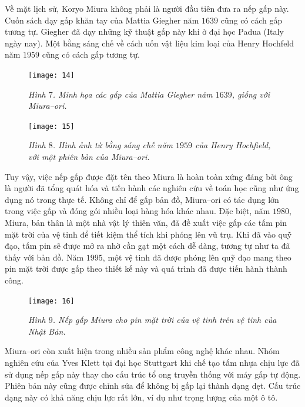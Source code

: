 \begin{multicols}{2}
	Về mặt lịch sử, Koryo Miura không phải là người đầu tiên đưa ra nếp gấp này. Cuốn sách dạy gấp khăn tay của Mattia Giegher năm $1639$ cũng có cách gấp tương tự. Giegher đã dạy những kỹ thuật gấp này khi ở đại học Padua (Italy ngày nay). Một bằng sáng chế về cách uốn vật liệu kim loại của Henry Hochfeld năm $1959$ cũng có cách gấp \linebreak tương tự.
	\begin{figure}[H]
		\vspace*{-5pt}
		\centering
		\captionsetup{labelformat= empty, justification=centering}
		\texttt{[image: 14]}
		\caption{\small\textit{\color{toanhocdoisong}Hình $7$. Minh họa các gấp của Mattia Giegher năm $1639$, giống với Miura--ori.}}
		\vspace*{-10pt}
	\end{figure}
	\begin{figure}[H]
		\vspace*{-5pt}
		\centering
		\captionsetup{labelformat= empty, justification=centering}
		\texttt{[image: 15]}
		\caption{\small\textit{\color{toanhocdoisong}Hình $8$. Hình ảnh từ bằng sáng chế năm $1959$ của Henry Hochfield, với một phiên bản của Miura--ori.}}
		\vspace*{-10pt}
	\end{figure}
	Tuy vậy, việc nếp gấp được đặt tên theo Miura là hoàn toàn xứng đáng bởi ông là người đã tổng quát hóa và tiến hành các nghiên cứu về toán học cũng như ứng dụng nó trong \linebreak thực tế.
	\vskip 0.1cm
	Không chỉ để gấp bản đồ, Miura--ori có tác dụng lớn trong việc gấp và đóng gói nhiều loại hàng hóa khác nhau. Đặc biệt, năm $1980$, Miura, bản thân là một nhà vật lý thiên văn, đã đề xuất việc gấp các tấm pin mặt trời của vệ tinh để tiết kiệm thể tích khi phóng lên vũ trụ. Khi đã vào quỹ đạo, tấm pin sẽ được mở ra nhờ cần gạt một cách dễ dàng, tương tự như ta đã thấy với bản đồ. Năm $1995$, một vệ tinh đã được phóng lên quỹ đạo mang theo pin mặt trời được gấp theo thiết kế này và quá trình đã được tiến hành thành công.
	\begin{figure}[H]
		\vspace*{-5pt}
		\centering
		\captionsetup{labelformat= empty, justification=centering}
		\texttt{[image: 16]}
		\caption{\small\textit{\color{toanhocdoisong}Hình $9$. Nếp gấp Miura cho pin mặt trời của vệ tinh trên vệ tinh của Nhật Bản.}}
		\vspace*{-10pt}
	\end{figure}
	Miura--ori còn xuất hiện trong nhiều sản phẩm công nghệ khác nhau. Nhóm nghiên cứu của Yves Klett tại đại học Stuttgart khi chế tạo tấm nhựa chịu lực đã sử dụng nếp gấp này thay cho cấu trúc tổ ong truyền thống với máy gấp tự động. Phiên bản này cũng được chỉnh sửa để không bị gấp lại thành dạng dẹt. Cấu trúc dạng này có khả năng chịu lực rất lớn, ví dụ như trọng lượng của một ô tô.

\end{multicols}
